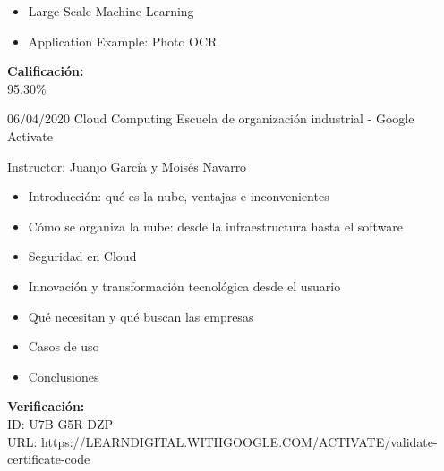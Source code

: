 \begin{entrylist}
{\begin{itemize}
    	        \item Large Scale Machine Learning
    	        \item Application Example: Photo OCR
    	    \end{itemize}
    	    \textbf{Calificación:} \\
    	    95.30\%
		}
	\entry
		{06/04/2020}
		{Cloud Computing}
		{Escuela de organización industrial - Google Activate}
		{
		    Instructor: Juanjo García y Moisés Navarro \\
		    \vspace{-5mm}
		    \begin{itemize}
		        \setlength\itemsep{0pt}
    	        \setlength\parskip{0pt}
		        \item Introducción: qué es la nube, ventajas e inconvenientes
		        \item Cómo se organiza la nube: desde la infraestructura hasta el software
		        \item Seguridad en Cloud
		        \item Innovación y transformación tecnológica desde el usuario
		        \item Qué necesitan y qué buscan las empresas
		        \item Casos de uso
		        \item Conclusiones
		    \end{itemize}
		    
		    \textbf{Verificación:} \\
		    ID: U7B G5R DZP \\
		    URL: https://LEARNDIGITAL.WITHGOOGLE.COM/ACTIVATE/validate-certificate-code
		}
\end{entrylist}